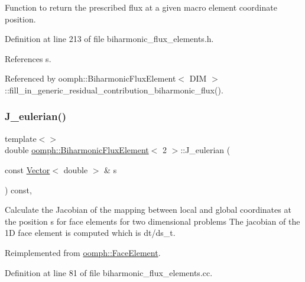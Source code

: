 Function to return the prescribed flux at a given macro element coordinate position. 



Definition at line 213 of file biharmonic\+\_\+flux\+\_\+elements.\+h.



References s.



Referenced by oomph\+::\+Biharmonic\+Flux\+Element$<$ D\+I\+M $>$\+::fill\+\_\+in\+\_\+generic\+\_\+residual\+\_\+contribution\+\_\+biharmonic\+\_\+flux().

\mbox{\label{classoomph_1_1BiharmonicFluxElement_af47fac27f81814b471df73b8c956a63e}} 
\subsubsection{\texorpdfstring{J\+\_\+eulerian()}{J\_eulerian()}\hspace{0.1cm}{\footnotesize\ttfamily [1/2]}}
{\footnotesize\ttfamily template$<$$>$ \\
double \hyperlink{classoomph_1_1BiharmonicFluxElement}{oomph\+::\+Biharmonic\+Flux\+Element}$<$ 2 $>$\+::J\+\_\+eulerian (\begin{DoxyParamCaption}\item[{const \hyperlink{classoomph_1_1Vector}{Vector}$<$ double $>$ \&}]{s }\end{DoxyParamCaption}) const\hspace{0.3cm}{\ttfamily [private]}, {\ttfamily [virtual]}}



Calculate the Jacobian of the mapping between local and global coordinates at the position s for face elements for two dimensional problems The jacobian of the 1D face element is computed which is dt/ds\+\_\+t. 



Reimplemented from \hyperlink{classoomph_1_1FaceElement_a919d0d76746eaa78a8a3c7f75f99a9e5}{oomph\+::\+Face\+Element}.



Definition at line 81 of file biharmonic\+\_\+flux\+\_\+elements.\+cc.



